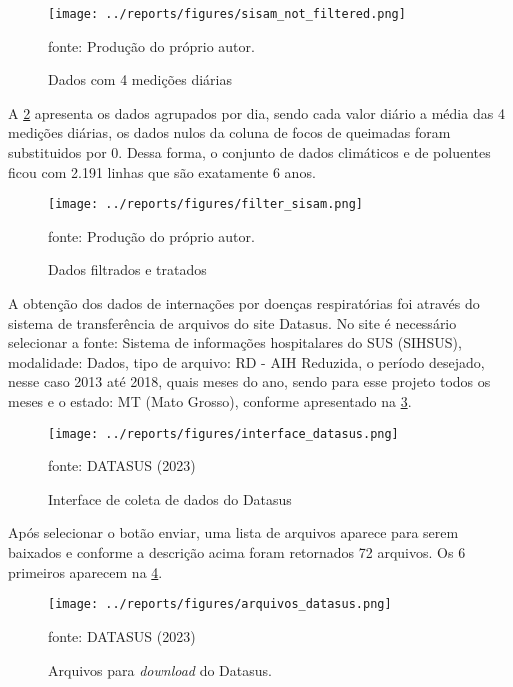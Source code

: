 \documentclass[
  12pt,		%
  a4paper,	%
  openright,%
  oneside,	%
  chapter=TITLE,		%
  section=TITLE,		%
  english,	%
  french,	%
  spanish,	%
  brazil	%
]{abntex2}
\begin{document}
    \begin{figure}[ht]
        \centering
        \caption{Dados com 4 medições diárias}
        \texttt{[image: ../reports/figures/sisam\_not\_filtered.png]}
        \label{sisam_not_filtered}
        \par
        {\small fonte: Produção do próprio autor.}
    \end{figure}

    A \ref*{sisam_filtered} apresenta os dados agrupados por dia, sendo cada valor diário a média das 4 medições diárias, os dados
    nulos da coluna de focos de queimadas foram substituidos por 0. Dessa forma, o conjunto de dados climáticos e de poluentes ficou
    com 2.191 linhas que são exatamente 6 anos.

    \begin{figure}[ht]
        \centering
        \caption{Dados filtrados e tratados}
        \texttt{[image: ../reports/figures/filter\_sisam.png]}
        \label{sisam_filtered}
        \par
        {\small fonte: Produção do próprio autor.}
    \end{figure}

    A obtenção dos dados de internações por doenças respiratórias foi através do sistema de transferência
    de arquivos do site Datasus. No site é necessário selecionar a fonte: Sistema de informações hospitalares do SUS (SIHSUS),
    modalidade: Dados, tipo de arquivo: RD - AIH Reduzida, o período desejado, nesse caso 2013 até 2018, quais meses do ano, sendo
    para esse projeto todos os meses e o estado: MT (Mato Grosso), conforme apresentado na \ref*{interface_datasus}.

    \begin{figure}[ht]
        \centering
        \caption{Interface de coleta de dados do Datasus}
        \texttt{[image: ../reports/figures/interface\_datasus.png]}
        \label{interface_datasus}
        \par
        {\small fonte: DATASUS (2023)}
    \end{figure}

    Após selecionar o botão enviar, uma lista de arquivos aparece para serem baixados e conforme a descrição acima foram
    retornados 72 arquivos. Os 6 primeiros aparecem na \ref*{arquivos_datasus}.

    \begin{figure}[ht]
        \centering
        \caption{Arquivos para \textit{download} do Datasus.}
        \texttt{[image: ../reports/figures/arquivos\_datasus.png]}
        \label{arquivos_datasus}
        \par
        {\small fonte: DATASUS (2023)}
    \end{figure}
\end{document}
